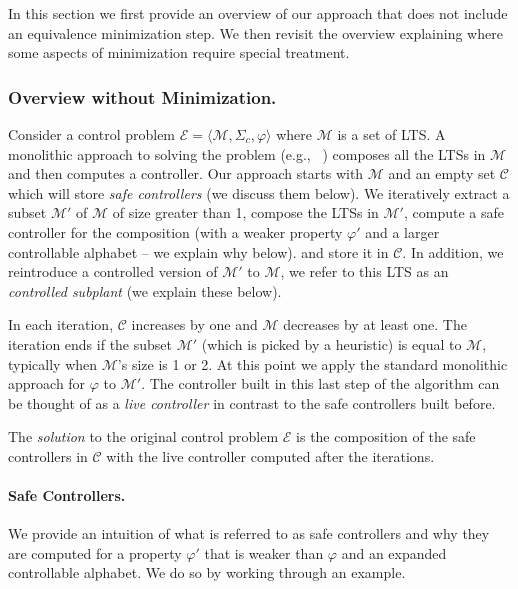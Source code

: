 \label{section:running-example}
In this section we first provide an overview of our approach that does not include an equivalence minimization 
step. We then revisit the 
overview explaining where some aspects of minimization require special treatment.

\vspace{-0.5cm}
\subsubsection{Overview without Minimization.} Consider a control problem $\mathcal{E} = \langle \mathcal{M}, \Sigma_c, \varphi 
\rangle$ where $\mathcal{M}$ is a set of LTS. A monolithic approach to solving the 
problem (e.g., ~\cite{DIppolito2008}) composes all the LTSs in $\mathcal{M}$ and 
then computes a controller. 
Our approach starts with $\mathcal{M}$ and an empty set $\mathcal{C}$ which 
will store \textit{safe controllers} (we discuss them below).  We 
iteratively extract a subset $\mathcal{M}'$ of  $\mathcal{M}$ of size greater than 1, 
compose the LTSs in $\mathcal{M'}$, compute a safe controller for the composition (with 
a weaker property $\varphi'$ and a larger controllable alphabet -- we explain why below). 
and store it in $\mathcal{C}$. In addition, we reintroduce a controlled version of  
$\mathcal{M}'$ to $\mathcal{M}$, 
we refer to this LTS as an \textit{controlled subplant} (we explain these below).  

In each iteration, $\mathcal{C}$ increases by one and $\mathcal{M}$ decreases 
by at least one.
The iteration ends if the subset $\mathcal{M}'$ (which is picked by a 
heuristic) is equal to $\mathcal{M}$, typically when $\mathcal{M}$'s size is 1 or 2. At this point we apply the standard monolithic 
approach for 
$\varphi$ to $\mathcal{M'}$. The controller built in this last step of the algorithm can be 
thought of as a 
\textit{live controller} in contrast to the safe controllers built before.

The \textit{solution} to the original control problem $\mathcal{E}$ is the composition of 
the safe controllers in $\mathcal{C}$ with the live controller computed after the 
iterations.

\paragraph{\textbf{Safe Controllers.}} We provide an intuition of what is referred to as 
safe controllers and why they are computed for a  property $\varphi'$ that is weaker than $\varphi$ and an 
expanded controllable alphabet. We do so by working through an example.

